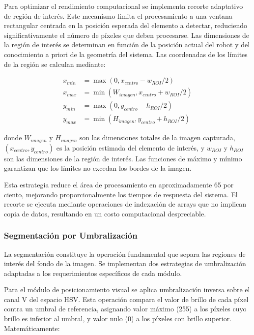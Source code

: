 Para optimizar el rendimiento computacional se implementa recorte adaptativo de región de interés. Este mecanismo limita el procesamiento a una ventana rectangular centrada en la posición esperada del elemento a detectar, reduciendo significativamente el número de píxeles que deben procesarse. Las dimensiones de la región de interés se determinan en función de la posición actual del robot y del conocimiento a priori de la geometría del sistema. Las coordenadas de los límites de la región se calculan mediante:

\begin{align}
x_{min} &= \max(0, x_{centro} - w_{ROI}/2) \\
x_{max} &= \min(W_{imagen}, x_{centro} + w_{ROI}/2) \\
y_{min} &= \max(0, y_{centro} - h_{ROI}/2) \\
y_{max} &= \min(H_{imagen}, y_{centro} + h_{ROI}/2)
\end{align}

donde $W_{imagen}$ y $H_{imagen}$ son las dimensiones totales de la imagen capturada, $(x_{centro}, y_{centro})$ es la posición estimada del elemento de interés, y $w_{ROI}$ y $h_{ROI}$ son las dimensiones de la región de interés. Las funciones de máximo y mínimo garantizan que los límites no excedan los bordes de la imagen.

Esta estrategia reduce el área de procesamiento en aproximadamente 65 por ciento, mejorando proporcionalmente los tiempos de respuesta del sistema. El recorte se ejecuta mediante operaciones de indexación de arrays que no implican copia de datos, resultando en un costo computacional despreciable.

\subsubsection{Segmentación por Umbralización}

La segmentación constituye la operación fundamental que separa las regiones de interés del fondo de la imagen. Se implementan dos estrategias de umbralización adaptadas a los requerimientos específicos de cada módulo.

Para el módulo de posicionamiento visual se aplica umbralización inversa sobre el canal V del espacio HSV. Esta operación compara el valor de brillo de cada píxel contra un umbral de referencia, asignando valor máximo (255) a los píxeles cuyo brillo es inferior al umbral, y valor nulo (0) a los píxeles con brillo superior. Matemáticamente:

